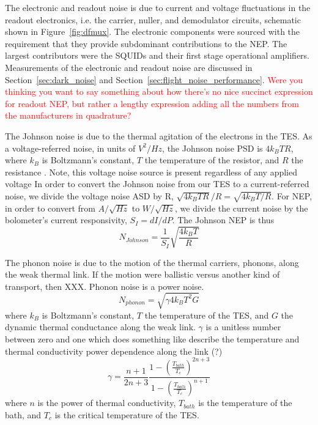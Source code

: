 The electronic and readout noise is due to current and voltage fluctuations in the readout electronics, i.e. the carrier, nuller, and demodulator circuits, schematic shown in Figure~\ref{fig:dfmux}. 
The electronic components were sourced with the requirement that they provide subdominant contributions to the \ac{NEP}. 
The largest contributors were the \ac{SQUID}s and their first stage operational amplifiers. 
Measurements of the electronic and readout noise are discussed in Section~\ref{sec:dark_noise} and Section~\ref{sec:flight_noise_performance}.
\textcolor{red}{Were you thinking you want to say something about how there's no nice succinct expression for readout \ac{NEP}, but rather a lengthy expression adding all the numbers from the manufacturers in quadrature?}

The Johnson noise is due to the thermal agitation of the electrons in the \ac{TES}. 
As a voltage-referred noise, in units of $V^2/Hz$, the Johnson noise \ac{PSD} is $4k_{B}TR$,
where $k_{B}$ is Boltzmann's constant, $T$ the temperature of the resistor, and $R$ the resistance \cite{}.
Note, this voltage noise source is present regardless of any applied voltage
In order to convert the Johnson noise from our \ac{TES} to a current-referred noise, we divide the voltage noise \ac{ASD} by R, $\sqrt{4k_{B}TR}/R = \sqrt{4k_BT/R}$. 
For \ac{NEP}, in order to convert from $A/\sqrt{Hz}$ to $W/\sqrt{Hz}$, we divide the current noise by the bolometer's current responsivity, $S_{I} = dI/dP$. 
The Johnson \ac{NEP} is thus
\begin{equation}
N_{Johnson} =  \frac{1}{S_I} \sqrt{ \frac{4k_{B}T}{R}}
\label{eq:johnson}
\end{equation}

The phonon noise is due to the motion of the thermal carriers, phonons, along the weak thermal link. 
If the motion were ballistic versus another kind of transport, then XXX. 
Phonon noise is a power noise. 
\begin{equation}
N_{phonon} = \sqrt{\gamma 4k_{B} T^2 G}
\label{eq:phonon}
\end{equation}
where $k_{B}$ is Boltzmann's constant, $T$ the temperature of the \ac{TES}, and $G$ the dynamic thermal conductance along the weak link. 
 $\gamma$ is a unitless number between zero and one which does something like describe the temperature and thermal conductivity power dependence along the link (?)  
\begin{equation}
\gamma = \frac{n+1}{2n+3} \frac{1-\left(\frac{T_{bath}}{T_c}\right)^{2n+3}}{1-\left(\frac{T_{bath}}{T_c}\right)^{n+1}}
\label{eq:gamma}
\end{equation}
where $n$ is the power of thermal conductivity, $T_{bath}$ is the temperature of the bath, and $T_c$ is the critical temperature of the \ac{TES}.

